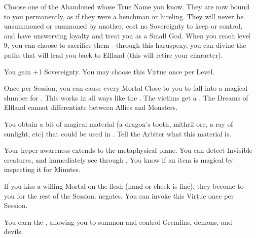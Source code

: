 \begin{multicols*}{2}




Choose one of the Abandoned whose True Name you know.  They are now bound to you permanently, as if they were a henchman or hireling. They will never be unsummoned or summoned by another, cost no Sovereignty to keep or control, and have unswerving loyalty and treat you as a Small God.  When you reach level 9, you can choose to sacrifice them - through this haruspexy, you can divine the paths that will lead you back to Elfland (this will retire your character).


You gain +1 Sovereignty.  You may choose this Virtue once per Level. 



Once per Session, you can cause every Mortal Close to you to fall into a magical slumber for .  This works in all ways like the . The victims get a .  The Dreams of Elfland cannot differentiate between Allies and Monsters.


You obtain a bit of magical material (a dragon's tooth, mithril ore, a ray of sunlight, etc) that could be used in .  Tell the Arbiter what this material is.


Your hyper-awareness extends to the metaphysical plane. You can detect Invisible creatures, and immediately see through . You know if an item is magical by inspecting it for Minutes.


If you kiss a willing Mortal on the flesh (hand or cheek is fine), they become  to you for the rest of the Session.  negates. You can invoke this Virtue once per Session.


You earn the , allowing you to summon and control Gremlins, demons, and devils.


\end{multicols*}
